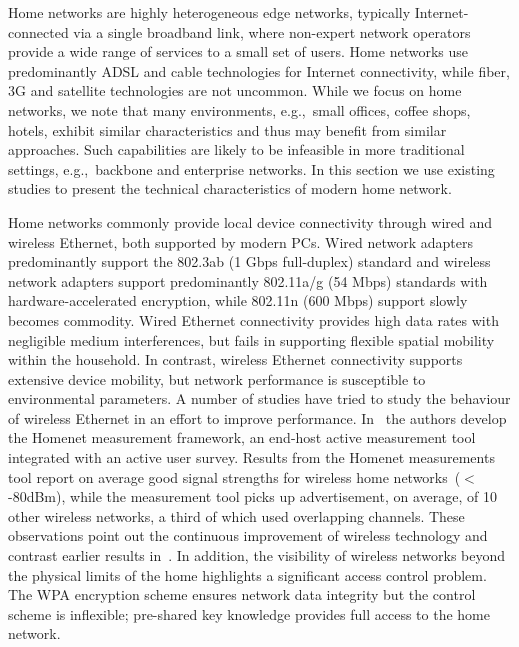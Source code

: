 Home networks are highly heterogeneous edge networks, typically
Internet-connected via a single broadband link, where non-expert network
operators provide a wide range of services to a small set of users.  Home
networks use predominantly ADSL and cable technologies for Internet
connectivity, while fiber, 3G and satellite technologies are not uncommon.
While we focus on home networks, we note that many environments, e.g.,~small
offices, coffee shops, hotels, exhibit similar characteristics and thus may
benefit from similar approaches. Such capabilities are likely to be infeasible
in more traditional settings, e.g.,~backbone and enterprise networks.  In this
section we use existing studies to present the technical characteristics of
modern home network. 

Home networks commonly provide local device connectivity through wired and
wireless Ethernet, both supported by modern PCs. Wired network
adapters predominantly support the 802.3ab (1 Gbps full-duplex) standard and
wireless network adapters support predominantly 802.11a/g (54 Mbps) standards
with hardware-accelerated encryption, while 802.11n (600 Mbps) support slowly
becomes commodity. Wired Ethernet connectivity provides high data rates with negligible
medium interferences, but fails in supporting flexible spatial mobility within
the household. In contrast, wireless Ethernet connectivity supports extensive
device mobility, but network performance is susceptible to environmental
parameters.  A number of studies have tried to study the behaviour of wireless
Ethernet in an effort to improve performance. In~\cite{homenetProfiler} the
authors develop the Homenet measurement framework, an end-host active
measurement tool integrated with an active user survey.  Results from the
Homenet measurements tool report on average good signal strengths for wireless
home networks~($<$ -80dBm), while the measurement tool picks up advertisement,
on average, of 10 other wireless networks, a third of which used overlapping
channels.  These observations point out the continuous improvement of wireless
technology and contrast earlier results in~\cite{Yarvis05characterizationof}.
In addition, the visibility of wireless networks beyond the physical limits of
the home highlights a significant access control problem. The WPA encryption scheme
ensures network data integrity but the control scheme is inflexible; pre-shared key
knowledge provides full access to the home network.

